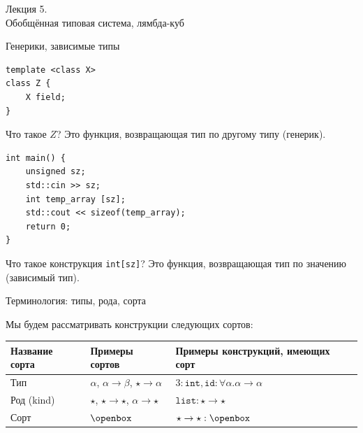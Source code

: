 \documentclass[aspectratio=169]{beamer}
\begin{document}
\newtheorem{dfn}{Определение}[section]
\newtheorem{nte}{Замечание}[section]

\newtheorem{axiom}{Аксиома}[section]
\newtheorem{thm}{Теорема}[section]
\newtheorem{lmm}[theorem]{Лемма}
\newtheorem{statement}{Утверждение}[section]
\newtheorem{oun_paragraph}{Пункт}[section]
\newtheorem{cons}{Следствие}[section]
\newtheorem*{exm}{Пример}

\newcommand{\comb}[1]{\operatorname{\bf{\textrm{#1}}}}
\newcommand{\func}[1]{\operatorname{#1}}
\newcommand{\reduction}[1]{{\color{OrangeRed}#1}}
\newcommand{\set}[1]{\left\{#1\right\}}

\def\from#1{\par \parbox{0.7\textwidth}{\par \hfill\raggedleft \it #1}} 

\begin{frame}{}
\begin{center}\Large Лекция 5.\\ \Large Обобщённая типовая система, лямбда-куб\end{center}
\end{frame}

\begin{frame}[fragile]{Генерики, зависимые типы}


\begin{verbatim}
template <class X>
class Z {
    X field;
}
\end{verbatim}

Что такое $Z$? Это функция, возвращающая тип по другому типу (генерик). %

\begin{verbatim}
int main() {
    unsigned sz;
    std::cin >> sz;
    int temp_array [sz];
    std::cout << sizeof(temp_array);
    return 0;
}
\end{verbatim}

Что такое конструкция \verb!int[sz]!? Это функция, возвращающая тип по значению (зависимый тип).

\end{frame}

\begin{frame}{Терминология: типы, рода, сорта}

Мы будем рассматривать конструкции следующих сортов:
\vspace{0.3cm}\begin{tabular}{lll}
Название сорта & Примеры сортов & Примеры конструкций, имеющих сорт\\\hline
Тип & $\alpha$, $\alpha\rightarrow\beta$, $\star\rightarrow\alpha$ & $3:\texttt{int}, \texttt{id}: \forall\alpha.\alpha\rightarrow\alpha$\\
Род (kind) & $\star$, $\star\rightarrow\star$, $\alpha\rightarrow\star$ & $\texttt{list}: \star\rightarrow\star$\\
Сорт & $\openbox$ & $\star\rightarrow\star : \openbox$
\end{tabular}

\end{frame}
\end{document}
